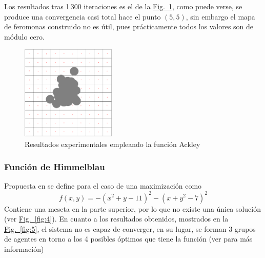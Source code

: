 \documentclass[runningheads]{llncs}
\newcommand{\refcruzada}[2]{\hyperref[#2]{#1~\ref{#2}}}
\begin{document}
    Los resultados tras 1\,300 iteraciones es el de la \refcruzada{Fig.}{fig:3}, como puede verse, se produce una convergencia casi total hace el punto $(5,5)$, sin embargo el mapa de feromonas construido no es útil, pues prácticamente todos los valores son de módulo cero.

    \begin{figure}[htbp]
        \centering
        \includegraphics[width=0.4\textwidth]{funciones/Resultado_ackley}
        \caption{Resultados experimentales empleando la función Ackley}
        \label{fig:3}
    \end{figure}

    \subsubsection{Función de Himmelblau} Propuesta en \cite{HimmelblauFunction} se define para el caso de una maximización como
    \[  f(x,y)=-(x^2 + y - 11)^2 - (x + y^2 - 7)^2  \]
    Contiene una meseta en la parte superior, por lo que no existe una única solución (ver \refcruzada{Fig.}{fig:4}).
    En cuanto a los resultados obtenidos, mostrados en la \refcruzada{Fig.}{fig:5}, el sistema no es capaz de converger, en su lugar, se forman 3 grupos de agentes en torno a los 4 posibles óptimos que tiene la función (ver \cite{WebFuncionesOptimizacion} para más información)
\end{document}
